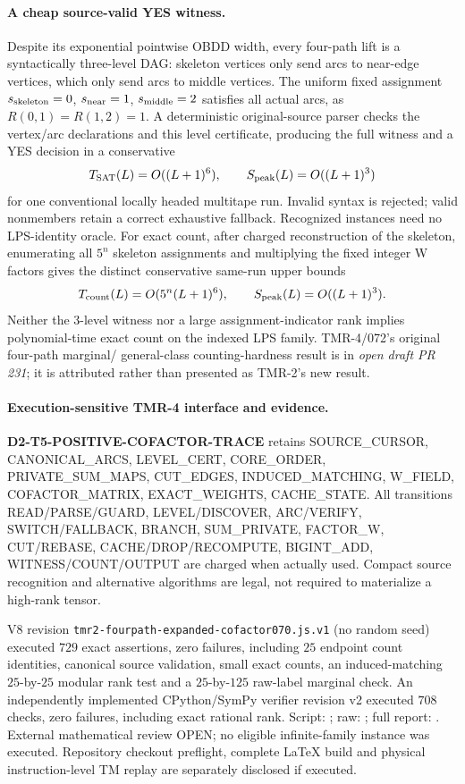 \documentclass[11pt]{article}
\begin{document}
\paragraph{A cheap source-valid YES witness.}
Despite its exponential pointwise OBDD width,
every four-path lift is a syntactically
three-level DAG: skeleton vertices only send
arcs to near-edge vertices, which only send arcs
to middle vertices. The uniform fixed assignment
$s_{\rm skeleton}=0$, $s_{\rm near}=1$,
$s_{\rm middle}=2$ satisfies all actual arcs,
as $R(0,1)=R(1,2)=1$.
A deterministic original-source parser checks
the vertex/arc declarations and this level
certificate, producing the full witness and
a YES decision in a conservative
\[
 T_{\rm SAT}(L)=O((L+1)^6),\qquad
 S_{\rm peak}(L)=O((L+1)^3)
\]
for one conventional locally headed multitape run.
Invalid syntax is rejected; valid nonmembers
retain a correct exhaustive fallback.
Recognized instances need no LPS-identity oracle.
For exact count, after charged reconstruction
of the skeleton, enumerating all $5^n$ skeleton
assignments and multiplying the fixed integer
W factors gives the distinct conservative
same-run upper bounds
\[
 T_{\rm count}(L)=O(5^n(L+1)^6),\qquad
 S_{\rm peak}(L)=O((L+1)^3).
\]
Neither the 3-level witness nor a large
assignment-indicator rank implies polynomial-time
exact count on the indexed LPS family.
TMR-4/072's original four-path marginal/
general-class counting-hardness result is in
\emph{open draft PR 231}; it is attributed rather
than presented as TMR-2's new result.

\paragraph{Execution-sensitive TMR-4 interface and evidence.}
\textbf{D2-T5-POSITIVE-COFACTOR-TRACE} retains
SOURCE\_CURSOR, CANONICAL\_ARCS, LEVEL\_CERT,
CORE\_ORDER, PRIVATE\_SUM\_MAPS, CUT\_EDGES,
INDUCED\_MATCHING, W\_FIELD, COFACTOR\_MATRIX,
EXACT\_WEIGHTS, CACHE\_STATE. All transitions
READ/PARSE/GUARD, LEVEL/DISCOVER, ARC/VERIFY,
SWITCH/FALLBACK, BRANCH, SUM\_PRIVATE,
FACTOR\_W, CUT/REBASE, CACHE/DROP/RECOMPUTE,
BIGINT\_ADD, WITNESS/COUNT/OUTPUT are charged
when actually used. Compact source recognition
and alternative algorithms are legal, not
required to materialize a high-rank tensor.

V8 revision \texttt{tmr2-fourpath-expanded-cofactor070.js.v1}
(no random seed) executed $729$ exact assertions,
zero failures, including $25$ endpoint count
identities, canonical source validation,
small exact counts, an induced-matching
$25$-by-$25$ modular rank test and a
$25$-by-$125$ raw-label marginal check.
An independently implemented CPython/SymPy
verifier revision v2 executed $708$ checks,
zero failures, including exact rational rank.
Script:
;
raw:
;
full report:
.
External mathematical review OPEN; no eligible
infinite-family instance was executed.
Repository checkout preflight, complete LaTeX
build and physical instruction-level TM replay
are separately disclosed if executed.
\end{document}
